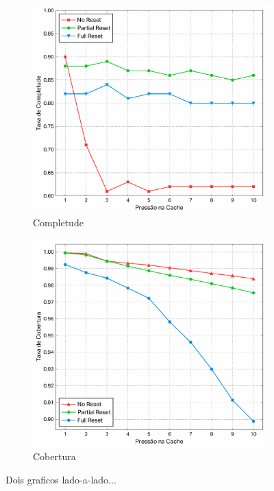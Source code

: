 \documentclass[11pt,twoside]{article}
\begin{document}
\begin{figure}[!ht]
        \centering
        \begin{subfigure}[b]{0.45\textwidth}
                \includegraphics[width=\textwidth]{./figs/reset-completion-ratio}
                \caption{Completude}
                \label{fig-completude1}
        \end{subfigure}
        \quad %
                \begin{subfigure}[b]{0.45\textwidth}
                \includegraphics[width=\textwidth]{./figs/reset-dynamic-cov}
                \caption{Cobertura}
                \label{fig-cobertura1}
        \end{subfigure}
\caption{Dois graficos lado-a-lado...}
\end{figure}
\end{document}
